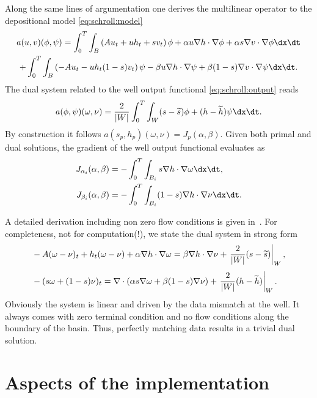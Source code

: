 Along the same lines of argumentation one derives the multilinear
operator to the depositional model \eqref{eq:schroll:model}
\begin{multline}
 a(u,v)(\phi,\psi) =
 \int_0^T \int_B \left(Au_t+uh_t+sv_t\right)\phi + \alpha u \nabla h \cdot \nabla \phi
   + \alpha s \nabla v \cdot \nabla \phi \dx \dt
\\
 + \int_0^T \int_B \left(-Au_t-uh_t(1-s)v_t\right)\psi -\beta u \nabla h \cdot \nabla \psi
   + \beta (1-s) \nabla v \cdot \nabla \psi \dx \dt.
\end{multline}
The dual system related to the well output functional \eqref{eq:schroll:output} reads
\begin{equation}
 a(\phi,\psi)(\omega,\nu) =
  \frac{2}{|W|} \int_0^T \int_W (s - \widetilde s) \phi + (h - \widetilde h) \psi \dx \dt.
\end{equation}
By construction it follows $a(s_p,h_p)(\omega,\nu) = J_p(\alpha,\beta)$.
Given both primal and dual solutions, the gradient of the well output functional evaluates as
\begin{align}
 J_{\alpha_i}(\alpha,\beta)
  &=
 - \int_0^T \int_{B_i} s \nabla h \cdot \nabla \omega \dx \dt,
\\
 J_{\beta_i}(\alpha,\beta) &=
 - \int_0^T \int_{B_i} (1-s) \nabla h \cdot \nabla \nu \dx \dt
 .
\end{align}

A detailed derivation including non zero flow conditions is given
in~\citet{Schroll2008}.  For completeness, not for computation(!), we
state the dual system in strong form
\begin{align}
 & \displaystyle -A(\omega-\nu)_t + h_t(\omega-\nu) + \alpha \nabla h \cdot \nabla \omega
 = \beta \nabla h \cdot \nabla \nu + \left. \frac{2}{|W|} (s - \widetilde s) \right|_W, \\[\jot]
 & \displaystyle -(s\omega + (1-s)\nu)_t
 = \nabla \cdot (\alpha s \nabla \omega + \beta (1-s) \nabla \nu) + \left. \frac{2}{|W|} (h - \widetilde h) \right|_W.
\end{align}
Obviously the system is linear and driven by the data mismatch at the
well.  It always comes with zero terminal condition and no flow
conditions along the boundary of the basin.  Thus, perfectly matching
data results in a trivial dual solution.

\section{Aspects of the implementation}

